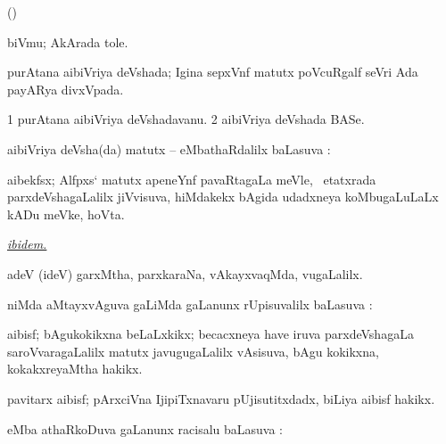 \bentry
{}
\gl{\saMkiSx}
\bmng
(\birx)  
\emng
\eentry

\bentry
{}
\gl{\nA}
\bmng
{}biVmu; AkArada tole. 
\emng
\eentry

\bentry
{}
\gl{\gu}
\bmng
purAtana aibiVriya deVshada; Igina sepxVnf matutx poVcuRgalf seVri Ada payARya divxVpada. 
\emng
\eentry

\bentry
{}
\gl{\nA}
\bmng
\bnum
\num{1} purAtana aibiVriya deVshadavanu. 
\num{2} aibiVriya deVshada BASe. 
\enum
\emng
\eentry

\bentry
{}
\gl{\sapUpa}
\bmng
aibiVriya deVsha(da) matutx -- eMbathaRdalilx baLasuva \pUparx:  
\emng
\eentry

\bentry
{}
\gl{\nA}
\bmng
aibekfsx; Alfpxs` matutx apeneYnf pavaRtagaLa meVle, \kanmu\ etatxrada parxdeVshagaLalilx jiVvisuva, hiMdakekx bAgida udadxneya koMbugaLuLaLx kADu meVke, hoVta.  
\emng
\eentry

\bentry
{}
\gl{\saMkiSx}
\bmng
\hyperlink{ibidem}{\it ibidem.} 
\emng
\eentry

\bentry
{}
\gl{\kirxvi}
\expl{\Latin}
\bmng
 adeV (ideV) garxMtha, parxkaraNa, vAkayxvaqMda, \mo vugaLalilx. 
\emng
\eentry

\bentry
{}
\gl{\uparx}
\bmng
{}niMda aMtayxvAguva \gu gaLiMda \nA gaLanunx rUpisuvalilx baLasuva \uparx:  
\emng
\eentry

\bentry
{}
\gl{\nA}
\bmng
aibisf; bAgukokikxna beLaLxkikx; becacxneya have iruva parxdeVshagaLa saroVvaragaLalilx matutx javugugaLalilx vAsisuva, bAgu kokikxna, kokakxreyaMtha hakikx.  
\emng

\noindent
\gl{\pagu}
\bmng
{} pavitarx aibisf; pArxciVna IjipiTxnavaru pUjisutitxdadx, biLiya aibisf hakikx. 
\emng
\eentry

\bentry
{}
\gl{\uparx}
\bmng
{} eMba athaRkoDuva \gu gaLanunx racisalu baLasuva \uparx:  
\emng
\eentry

